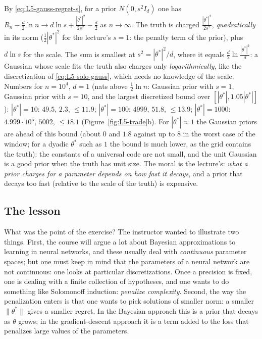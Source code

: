 \begin{beyond}
By \eqref{eq:L5-gauss-regret-s}, for a prior $N(0,s^2I_d)$ one has $R_n-\frac d2\ln n\to d\ln s+\frac{|\theta^*|^2}{2s^2}-\frac d2$ as $n\to\infty$. The truth is charged $\frac{|\theta^*|^2}{2s^2}$, \emph{quadratically} in its norm ($\frac12|\theta^*|^2$ for the lecture's $s=1$: the penalty term of the prior), plus $d\ln s$ for the scale. The sum is smallest at $s^2=|\theta^*|^2/d$, where it equals $\frac d2\ln\frac{|\theta^*|^2}d$: a Gaussian whose scale fits the truth also charges only \emph{logarithmically}, like the discretization of \eqref{eq:L5-solo-gauss}, which needs no knowledge of the scale. Numbers for $n=10^4$, $d=1$ (nats above $\frac12\ln n$: Gaussian prior with $s=1$, Gaussian prior with $s=10$, and the largest discretized bound over $[|\theta^*|,1.05|\theta^*|]$): $|\theta^*|=10$: $49.5$, $2.3$, $\le11.9$; $|\theta^*|=100$: $4999$, $51.8$, $\le13.9$; $|\theta^*|=1000$: $4.999\cdot10^5$, $5002$, $\le18.1$ (Figure~\ref{fig:L5-trade}b). For $|\theta^*|\approx1$ the Gaussian priors are ahead of this bound (about $0$ and $1.8$ against up to $8$ in the worst case of the window; for a dyadic $\theta^*$ such as $1$ the bound is much lower, as the grid contains the truth): the constants of a universal code are not small, and the unit Gaussian is a good prior when the truth has unit size. The moral is the lecture's: \emph{what a prior charges for a parameter depends on how fast it decays}, and a prior that decays too fast (relative to the scale of the truth) is expensive.
\end{beyond}

\subsection{The lesson}\label{sec:L5-lesson}
What was the point of the exercise? The instructor wanted to illustrate two things. First, the course will argue a lot about Bayesian approximations to learning in neural networks, and these usually deal with \emph{continuous} parameter spaces; but one must keep in mind that the parameters of a neural network are not continuous: one looks at particular discretizations. Once a precision is fixed, one is dealing with a finite collection of hypotheses, and one wants to do something like Solomonoff induction: \emph{penalize complexity}. Second, the way the penalization enters is that one wants to pick solutions of smaller norm: a smaller $\|\theta^*\|$ gives a smaller regret. In the Bayesian approach this is a prior that decays as $\theta$ grows; in the gradient-descent approach it is a term added to the loss that penalizes large values of the parameters.

